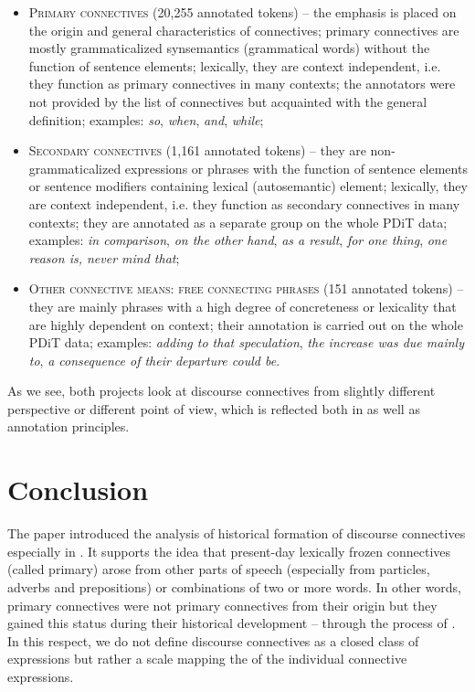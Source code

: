 \documentclass[output=paper]{langsci/langscibook.cls}
\begin{document}
\begin{itemize}

\item \textsc{Primary connectives} (20,255 annotated tokens) – 
the emphasis is placed on the origin and general characteristics of connectives; primary connectives are mostly grammaticalized synsemantics (grammatical words) without the function of sentence elements; lexically, they are context independent, i.e. they function as primary connectives in many contexts; the annotators were not provided by the list of connectives but acquainted with the general definition; examples: \textit{so}, \textit{when}, \textit{and}, \textit{while}; 


\item \textsc{Secondary connectives} (1,161 annotated tokens) – 
they are non-gram\-mat\-icalized expressions or phrases with the function of sentence elements or sentence modifiers containing lexical (autosemantic) element; lexically, they are context independent, i.e. they function as secondary connectives in many contexts; they are annotated as a separate group on the whole PDiT data; examples: \textit{in comparison}, \textit{on the other hand}, \textit{as a result}, \textit{for one thing}, \textit{one reason is, never mind that};


\item \textsc{Other connective means: free connecting phrases} (151 annotated tokens) – they are mainly  phrases with a high degree of concreteness or lexicality that are highly dependent on context; their annotation is carried out on the whole PDiT data; examples: \textit{adding to that speculation}, \textit{the increase was due mainly to}, \textit{a consequence of their departure could be}.

\end{itemize}

As we see, both projects look at discourse connectives from slightly different perspective or different point of view, which is reflected both in  as well as annotation principles.


\section{Conclusion}


The paper introduced the analysis of historical formation of discourse connectives especially in . It supports the idea that present-day lexically frozen connectives (called primary) arose from other parts of speech (especially from particles, adverbs and prepositions) or combinations of two or more words. In other words, primary connectives were not primary connectives from their origin but they gained this status during their historical development – through the process of . In this respect, we do not define discourse connectives as a closed class of expressions but rather a scale mapping the  of the individual connective expressions. 
\end{document}
